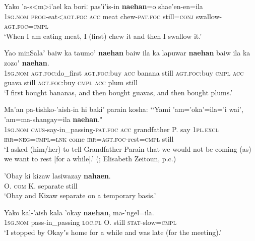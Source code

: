 \begin{exe}
	\ex 
	\gll Yako 'a-s<m>i'ael ka boriː pas'i'is-in \textbf{naehan}=o shae'en-en=ila\\
	1\textsc{sg}.\textsc{nom} \textsc{prog}-eat<\textsc{agt}.\textsc{foc} \textsc{acc} meat chew-\textsc{pat}.\textsc{foc} still=\textsc{conj} swallow-\textsc{agt}.\textsc{foc}=\textsc{cmpl}\\
	\glt \lq When I am eating meat, I (first) chew it and then I swallow it.\rq{ }\parencite[546]{ZeitounEtal2015}
	
	\ex\label{exAppendixSaisiyatFirst4}
	\gll Yao minSalaʼ baiw ka taumoʼ \textbf{naehan} baiw ila ka lapuwar \textbf{naehan} baiw ila ka zozoʼ \textbf{naehan}.\\
	1\textsc{sg}.\textsc{nom} \textsc{agt}.\textsc{foc}:do\_first \textsc{agt}.\textsc{foc}:buy \textsc{acc} banana still \textsc{agt}.\textsc{foc}:buy \textsc{cmpl} \textsc{acc} guava still \textsc{agt}.\textsc{foc}:buy \textsc{cmpl} \textsc{acc} plum still\\
	\glt \lq I first bought bananas, and then bought guavas, and then bought plums.' \parencite[116]{Huang2008} 

	\ex\label{exAppendixSaisiyatWhile2}
	\gll Ma’an pa-tishko-\rq{}aish-in hi baki’ parain kosha: \lq\lq Yami 'am='oka’=ila=’i wai', 'am=ma-shangay=ila \textbf{naehan}."\\
	1\textsc{sg}.\textsc{nom} \textsc{caus}-say-in\_passing-\textsc{pat}.\textsc{foc} \textsc{acc} grandfather P. say \phantom{\lq\lq}1\textsc{pl}.\textsc{excl} \textsc{irr}=\textsc{neg}=\textsc{cmpl}=\textsc{lnk}	 come \textsc{irr}=\textsc{agt}.\textsc{foc}-rest=\textsc{cmpl} still\\
	\glt \lq I asked (him/her) to tell Grandfather Parain that we would not be coming (as) we want to rest [for a while].' (\cite[262]{ZeitounEtal2015}; Elisabeth Zeitoun, p.c.)
	
	\ex\label{exAppendixSaisiyatWhile3}
	\gll 'Obay ki kizaw lasiwazay \textbf{nahaen}.\\
	O. \textsc{com} K. separate still\\
	\glt \lq Obay and Kizaw separate on a temporary basis.' \parencite[231]{Huang2008} 

	\ex\label{exAppendixSaisiyatWhile4}
	\gll Yako kal-'aish kala 'okay \textbf{naehan}, ma-'ngel=ila.\\
	1\textsc{sg}.\textsc{nom} pass-in\_passing \textsc{loc}.\textsc{pl} O. still \textsc{stat}-slow=\textsc{cmpl}\\
	\glt \lq I stopped by Okayʼs home for a while and was late (for the meeting).' \parencite[561]{ZeitounEtal2015}
\end{exe}	

